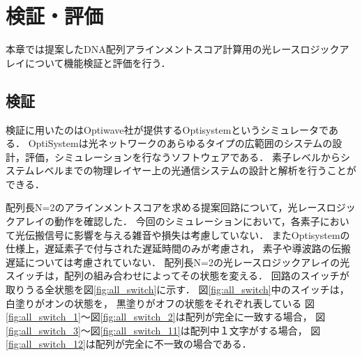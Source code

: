 \chapter{検証・評価}
本章では提案したDNA配列アラインメントスコア計算用の光レースロジックアレイについて機能検証と評価を行う．
\section{検証}
検証に用いたのはOptiwave社が提供するOptisystemというシミュレータである．
OptiSystemは光ネットワークのあらゆるタイプの広範囲のシステムの設計，評価，シミュレーションを行なうソフトウェアである．
素子レベルからシステムレベルまでの物理レイヤー上の光通信システムの設計と解析を行うことができる．

配列長N=2のアラインメントスコアを求める提案回路について，光レースロジックアレイの動作を確認した．
今回のシミュレーションにおいて，各素子において光伝搬信号に影響を与える雑音や損失は考慮していない．
またOptisystemの仕様上，遅延素子で付与された遅延時間のみが考慮され，
素子や導波路の伝搬遅延については考慮されていない．
配列長N=2の光レースロジックアレイの光スイッチは，配列の組み合わせによってその状態を変える．
回路のスイッチが取りうる全状態を図\ref{fig:all_switch}に示す．
図\ref{fig:all_switch}中のスイッチは，白塗りがオンの状態を，
黒塗りがオフの状態をそれぞれ表している
図\ref{fig:all_switch_1}〜図\ref{fig:all_switch_2}は配列が完全に一致する場合，
図\ref{fig:all_switch_3}〜図\ref{fig:all_switch_11}は配列中１文字がする場合，
図\ref{fig:all_switch_12}は配列が完全に不一致の場合である．

